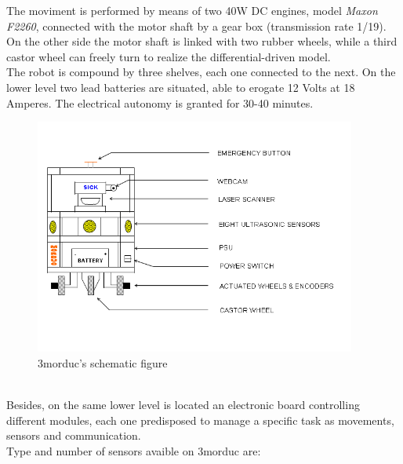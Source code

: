 The moviment is performed by means of two 40W DC engines, model
\textit{Maxon F2260}, connected with the motor shaft by a gear
box (transmission rate 1/19). On the other side the motor shaft
is linked with two rubber wheels, while a third castor wheel can
freely turn to realize the differential-driven model.
\\
The robot is compound by three shelves, each one connected to
the next. On the lower level two lead batteries are situated,
able to erogate 12 Volts at 18 Amperes. The electrical autonomy is
granted for 30-40 minutes.
\begin{figure}[h]
  \begin{center}
    \includegraphics[width=300pt]{img/Morduc_scheme.png}
    \caption{3morduc's schematic figure}
    \label{fig:morduc_scheme}
  \end{center}
\end{figure}
\\
Besides, on the same lower level is located an electronic board
controlling different modules, each one predisposed to manage a
specific task as movements, sensors and communication.
\\
Type and number of sensors avaible on 3morduc are:

